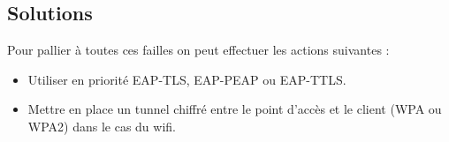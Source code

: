 \subsection{Solutions}

Pour pallier à toutes ces failles on peut effectuer les actions suivantes : 
\begin{itemize}
\item Utiliser en priorité EAP-TLS, EAP-PEAP ou EAP-TTLS. 
\item Mettre en place un tunnel chiffré entre le point d’accès et le client (WPA ou WPA2) dans le cas du wifi. 
\end{itemize}

